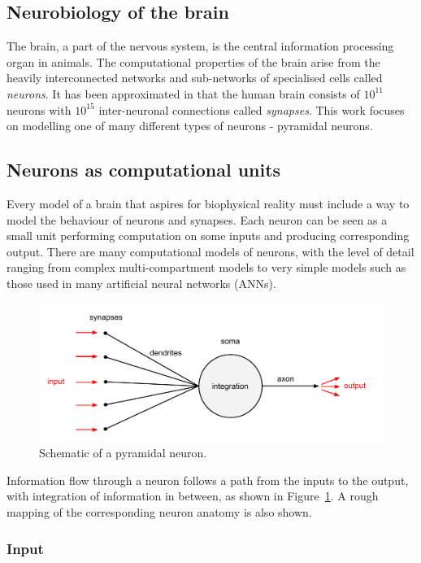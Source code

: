 \documentclass[a4paper,12pt]{report}
\theoremstyle{definition}
\begin{document}
\subsection{Neurobiology of the brain} %
The brain, a part of the nervous system, is the central information processing organ in animals. The computational properties of the brain arise from the heavily interconnected networks and sub-networks of specialised cells called \emph{neurons}. It has been approximated in \cite{herculano2009human} that the human brain consists of $10^{11}$ neurons with $10^{15}$ inter-neuronal connections called \emph{synapses}. This work focuses on modelling one of many different types of neurons - pyramidal neurons.


\subsection{Neurons as computational units}
Every model of a brain that aspires for biophysical reality must include a way to model the behaviour of neurons and synapses. Each neuron can be seen as a small unit performing computation on some inputs and producing corresponding output. There are many computational models of neurons, with the level of detail ranging from complex multi-compartment models to very simple models such as those used in many artificial neural networks (ANNs). 

\begin{figure}[h]
    \includegraphics[width=\textwidth]{figures/fig1.pdf}
    \caption{Schematic of a pyramidal neuron.}
    \label{fig:pyramidal}
\end{figure}

Information flow through a neuron follows a path from the inputs to the output, with integration of information in between, as shown in Figure~\ref{fig:pyramidal}. A rough mapping of the corresponding neuron anatomy is also shown.


\subsubsection{Input}
\end{document}
